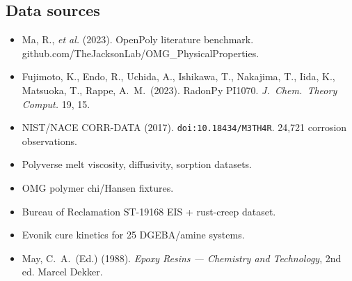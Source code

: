 \documentclass[10pt,a4paper]{article}
\begin{document}
\subsection*{Data sources}
\begin{itemize}\footnotesize
\item Ma, R., \textit{et al.} (2023). OpenPoly literature benchmark. github.com/TheJacksonLab/OMG\_PhysicalProperties.
\item Fujimoto, K., Endo, R., Uchida, A., Ishikawa, T., Nakajima, T., Iida, K., Matsuoka, T., Rappe, A.\ M.\ (2023). RadonPy PI1070. \emph{J.\ Chem.\ Theory Comput.} 19, 15.
\item NIST/NACE CORR-DATA (2017). \texttt{doi:10.18434/M3TH4R}. 24,721 corrosion observations.
\item Polyverse melt viscosity, diffusivity, sorption datasets.
\item OMG polymer chi/Hansen fixtures.
\item Bureau of Reclamation ST-19168 EIS + rust-creep dataset.
\item Evonik cure kinetics for 25 DGEBA/amine systems.
\item May, C.\ A.\ (Ed.) (1988). \emph{Epoxy Resins --- Chemistry and Technology}, 2nd ed. Marcel Dekker.
\end{itemize}
\end{document}
